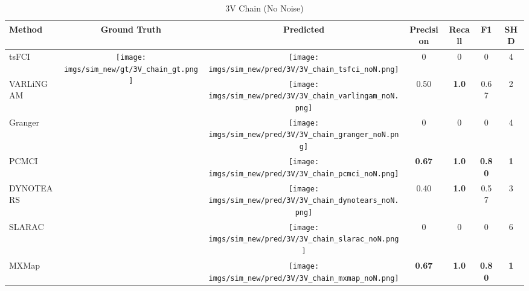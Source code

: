 \begin{table}[htb]
\begin{tabular}{l|c|c|c|c|c|c}
Method    & Ground Truth      & Predicted & Precision     & Recall       & F1            & SHD        \\ \hline
tsFCI     & \multirow{7}{*}[-3em]{\begin{minipage}{.17\linewidth} \centering \texttt{[image: imgs/sim\_new/gt/3V\_chain\_gt.png]} \end{minipage}} & \begin{minipage}{.17\linewidth} \centering \texttt{[image: imgs/sim\_new/pred/3V/3V\_chain\_tsfci\_noN.png]} \end{minipage}& 0             & 0            & 0             & 4          \\
VARLiNGAM &                   &\begin{minipage}{.17\linewidth} \centering \texttt{[image: imgs/sim\_new/pred/3V/3V\_chain\_varlingam\_noN.png]} \end{minipage}& 0.50          & \textbf{1.0} & 0.67          & 2          \\
Granger   &                   &\begin{minipage}{.17\linewidth} \centering \texttt{[image: imgs/sim\_new/pred/3V/3V\_chain\_granger\_noN.png]} \end{minipage}& 0             & 0            & 0             & 4          \\
PCMCI     &                   &\begin{minipage}{.17\linewidth} \centering \texttt{[image: imgs/sim\_new/pred/3V/3V\_chain\_pcmci\_noN.png]} \end{minipage}& \textbf{0.67} & \textbf{1.0} & \textbf{0.80} & \textbf{1} \\
DYNOTEARS &                   &\begin{minipage}{.17\linewidth} \centering \texttt{[image: imgs/sim\_new/pred/3V/3V\_chain\_dynotears\_noN.png]} \end{minipage}& 0.40          & \textbf{1.0} & 0.57          & 3          \\
SLARAC    &                   &\begin{minipage}{.17\linewidth} \centering \texttt{[image: imgs/sim\_new/pred/3V/3V\_chain\_slarac\_noN.png]} \end{minipage}& 0             & 0            & 0             & 6          \\ \cline{1-1} \cline{3-7} 
MXMap     &                   & \begin{minipage}{.17\linewidth} \centering \texttt{[image: imgs/sim\_new/pred/3V/3V\_chain\_mxmap\_noN.png]} \end{minipage}& \textbf{0.67} & \textbf{1.0} & \textbf{0.80} & \textbf{1}
\end{tabular}
\caption{3V Chain (No Noise)}
\label{tab:3V_chain_noN}
\end{table}

